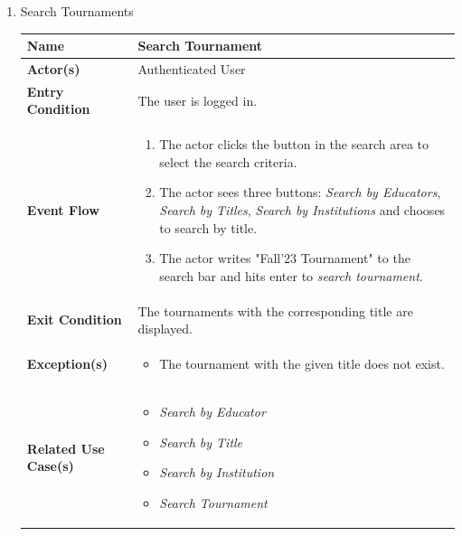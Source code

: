 \begin{enumerate}
\item Search Tournaments
\begin{center}
    \begin{tabular}{ | m{10em} | m{10cm}| } 
      \hline
      \textbf{Name} & Search Tournament  \\ 
      \hline
      \textbf{Actor(s)} & Authenticated User \\ 
      \hline
      \textbf{Entry Condition} & The user is logged in. \\ 
      \hline
      \textbf{Event Flow} & 
          \begin{enumerate}[(1)]
              \item The actor clicks the button in the search area to select the search criteria.
              \item The actor sees three buttons: \textit{Search by Educators}, \textit{Search by Titles}, \textit{Search by Institutions} and chooses to search by title.
              \item The actor writes "Fall'23 Tournament" to the search bar and hits enter to \textit{search tournament}.
          \end{enumerate}
      \\ 
      \hline
      \textbf{Exit Condition} & The tournaments with the corresponding title are displayed.  \\ 
      \hline
      \textbf{Exception(s)} & 
      \begin{itemize}
          \item The tournament with the given title does not exist.
      \end{itemize}
          \\ 
      \hline
      \textbf{Related Use Case(s)} & 
      \begin{itemize}
          \item \textit{Search by Educator}
          \item \textit{Search by Title}
          \item \textit{Search by Institution}
          \item \textit{Search Tournament}
      \end{itemize}
          \\ 
      \hline
    \end{tabular}
        \label{tbl:uc9}
\end{center}



\end{enumerate}
